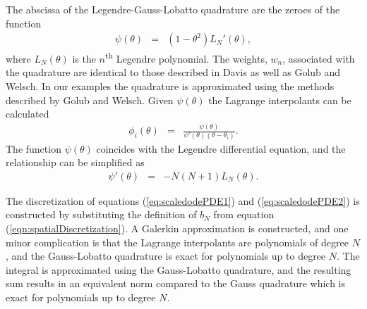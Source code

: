 \documentclass[review,authoryear]{elsarticle}
\begin{document}
The abscissa of the Legendre-Gauss-Lobatto quadrature are the zeroes
of the function
\begin{eqnarray}
  \psi(\theta) & = & \left(1-\theta^2\right) L_{N}'(\theta),
\end{eqnarray}
where $L_N(\theta)$ is the $n$\textsuperscript{th} Legendre
polynomial\citep{davis2007methods}.  The weights, $w_n$, associated
with the quadrature are identical to those described in
Davis\citep{davis2007methods} as well as Golub and
Welsch\citep{gaussQuadratureRules}. In our examples the quadrature is
approximated using the methods described by Golub and
Welsch\citep{gaussQuadratureRules}.  Given $\psi(\theta)$ the Lagrange
interpolants can be calculated
\begin{eqnarray}
  \phi_i(\theta) & = & \frac{\psi(\theta)}{\psi'(\theta)(\theta-\theta_i)}.
\end{eqnarray}
The function $\psi(\theta)$ coincides with the Legendre differential
equation, and the relationship can be simplified as
\begin{eqnarray}
  \psi'(\theta) & = & -N(N+1)L_N(\theta).
\end{eqnarray}

The discretization of equations (\ref{eq:scaledodePDE1}) and
(\ref{eq:scaledodePDE2}) is constructed by substituting the definition
of $b_N$ from equation (\ref{eqn:spatialDiscretization}). A Galerkin
approximation is constructed, and one minor complication is that the
Lagrange interpolants are polynomials of degree $N$, and the
Gauss-Lobatto quadrature is exact for polynomials up to degree
$N$. The integral is approximated using the Gauss-Lobatto quadrature,
and the resulting sum results in an equivalent norm compared to the
Gauss quadrature which is exact for polynomials up to degree
$N$\citep{SobolevCanutoQuarteroni}.
\end{document}
